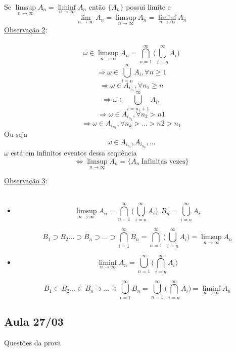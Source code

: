 \documentclass[a4paper,12pt]{article}
\begin{document}
Se $\limsup\limits_{n\rightarrow \infty} A_n=\liminf\limits_{n\rightarrow \infty} A_n$ então $\{A_n\} $ possui limite e 
$$\displaystyle{\lim_{n \to \infty}}  A_n=\limsup\limits_{n\rightarrow \infty} A_n=\liminf\limits_{n\rightarrow \infty} A_n $$
\underline{Observação 2}:\\
\\
$$\omega  \in\limsup\limits_{n\rightarrow \infty} A_n = \bigcap\limits_{n=1}^\infty\bigg(\bigcup\limits_{i=n}^\infty A_i\bigg) $$
$$\Rightarrow  \omega \in \bigcup\limits_{i=n}^\infty A_i, \forall n\ge 1$$
$$\Rightarrow\omega \in A_{i_{n_1} },\forall n_1\ge n $$
$$\Rightarrow  \omega \in \bigcup\limits_{i=n_1+1}^\infty A_i,$$
$$\Rightarrow\omega \in A_{i_{n_2 }},\forall n_2> n1 $$
$$\Rightarrow\omega \in A_{i_{n_k }},\forall n_k>\ldots> n2>n_1 $$
Ou seja
$$\omega \in A_{i_{n_1} },A_{i_{n_2} },\ldots $$
$\omega $ está em infinitos eventos dessa sequência
$$ \Leftrightarrow \displaystyle{\limsup_{n \to \infty}}  A_n = \{A_n\  \text{Infinitas vezes}\}$$
\newpage

\underline{Observação 3}:\\
\\
\begin{itemize}
	\item 

$$\limsup\limits_{n\rightarrow \infty} A_n = \bigcap\limits_{n=1}^\infty\bigg(\bigcup\limits_{i=n}^\infty A_i\bigg), B_n = \bigcup\limits_{i=n}^\infty A_i $$

$$B_1\supset B_2 \ldots \supset B_n \supset \ldots \supset \bigcap\limits_{i=1}^{\infty}B_n= \bigcap\limits_{n=1}^\infty\bigg(\bigcup\limits_{i=n}^\infty A_i\bigg)=\limsup\limits_{n\rightarrow \infty} A_n$$


\item 
$$\liminf\limits_{n\rightarrow \infty} A_n = \bigcup\limits_{n=1}^\infty\bigg(\bigcap\limits_{i=n}^\infty A_i\bigg)$$

$$B_1\subset B_2 \ldots \subset B_n \supset \ldots \supset \bigcup\limits_{i=1}^{\infty}B_n= \bigcup\limits_{n=1}^\infty\bigg(\bigcap\limits_{i=n}^\infty A_i\bigg)=\liminf\limits_{n\rightarrow \infty} A_n$$

\end{itemize}

\newpage
\subsection{Aula 27/03}

Questões da prova
\end{document}
